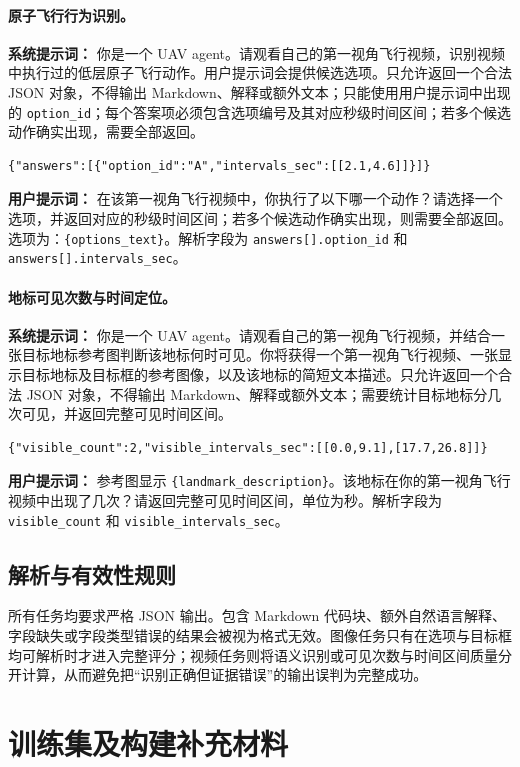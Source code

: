 \begin{thesisappendix}
\paragraph{原子飞行行为识别。}
\textbf{系统提示词：} 你是一个 UAV agent。请观看自己的第一视角飞行视频，识别视频中执行过的低层原子飞行动作。用户提示词会提供候选选项。只允许返回一个合法 JSON 对象，不得输出 Markdown、解释或额外文本；只能使用用户提示词中出现的 \texttt{option\_id}；每个答案项必须包含选项编号及其对应秒级时间区间；若多个候选动作确实出现，需要全部返回。
\begin{verbatim}
{"answers":[{"option_id":"A","intervals_sec":[[2.1,4.6]]}]}
\end{verbatim}
\textbf{用户提示词：} 在该第一视角飞行视频中，你执行了以下哪一个动作？请选择一个选项，并返回对应的秒级时间区间；若多个候选动作确实出现，则需要全部返回。选项为：\texttt{\{options\_text\}}。解析字段为 \texttt{answers[].option\_id} 和 \texttt{answers[].intervals\_sec}。

\paragraph{地标可见次数与时间定位。}
\textbf{系统提示词：} 你是一个 UAV agent。请观看自己的第一视角飞行视频，并结合一张目标地标参考图判断该地标何时可见。你将获得一个第一视角飞行视频、一张显示目标地标及目标框的参考图像，以及该地标的简短文本描述。只允许返回一个合法 JSON 对象，不得输出 Markdown、解释或额外文本；需要统计目标地标分几次可见，并返回完整可见时间区间。
\begin{verbatim}
{"visible_count":2,"visible_intervals_sec":[[0.0,9.1],[17.7,26.8]]}
\end{verbatim}
\textbf{用户提示词：} 参考图显示 \texttt{\{landmark\_description\}}。该地标在你的第一视角飞行视频中出现了几次？请返回完整可见时间区间，单位为秒。解析字段为 \texttt{visible\_count} 和 \texttt{visible\_intervals\_sec}。

\subsection{解析与有效性规则}

所有任务均要求严格 JSON 输出。包含 Markdown 代码块、额外自然语言解释、字段缺失或字段类型错误的结果会被视为格式无效。图像任务只有在选项与目标框均可解析时才进入完整评分；视频任务则将语义识别或可见次数与时间区间质量分开计算，从而避免把“识别正确但证据错误”的输出误判为完整成功。
\section{训练集及构建补充材料}
\label{app:train-dataset-construction}


\end{thesisappendix}
